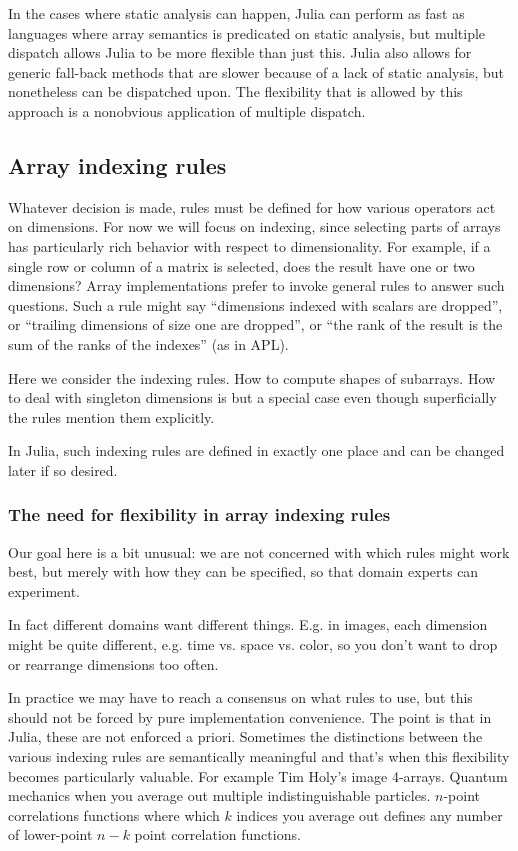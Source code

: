 \documentclass[preprint]{sigplanconf}
\begin{document}
In the cases where static analysis can happen, Julia can perform as fast as
languages where array semantics is predicated on static analysis, but multiple
dispatch allows Julia to be more flexible than just this. Julia also allows
for generic fall-back methods that are slower because of a lack of static
analysis, but nonetheless can be dispatched upon. The flexibility that is
allowed by this approach is a nonobvious application of multiple
dispatch.

\subsection{Array indexing rules}

Whatever decision is made, rules must be defined for how various operators act
on dimensions. For now we will focus on indexing, since selecting parts of
arrays has particularly rich behavior with respect to dimensionality. For
example, if a single row or column of a matrix is selected, does the result
have one or two dimensions? Array implementations prefer to invoke general
rules to answer such questions. Such a rule might say ``dimensions indexed
with scalars are dropped'', or ``trailing dimensions of size one are
dropped'', or ``the rank of the result is the sum of the ranks of the
indexes'' (as in APL).

Here we consider the indexing rules. How to compute shapes of subarrays. How
to deal with singleton dimensions is but a special case even though
superficially the rules mention them explicitly.

In Julia, such indexing rules are defined in exactly one place and can be
changed later if so desired.

\subsubsection{The need for flexibility in array indexing rules}

Our goal here is a bit unusual: we are not concerned with which rules might
work best, but merely with how they can be specified, so that domain experts
can experiment.

In fact different domains want different things. E.g. in images, each
dimension might be quite different, e.g. time vs. space vs. color, so you
don't want to drop or rearrange dimensions too often.

In practice we may have to reach a consensus on what rules to use, but this
should not be forced by pure implementation convenience.
The point is that in Julia, these are not enforced a priori. Sometimes the
distinctions between the various indexing rules are semantically meaningful
and that's when this flexibility becomes particularly valuable. For example
Tim Holy's image 4-arrays. Quantum mechanics when you average out multiple
indistinguishable particles. $n$-point correlations functions where which $k$
indices you average out defines any number of lower-point $n-k$ point
correlation functions.
\end{document}
